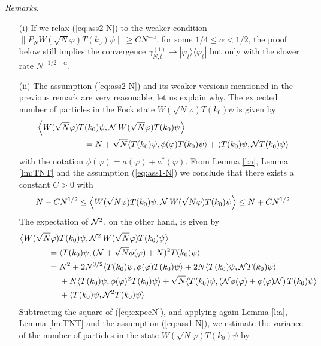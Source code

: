 \documentclass[11pt,a4paper]{article}
\newcommand{\cN}{{\cal N}}
\begin{document}
{\it Remarks. } 
\begin{itemize}
\item[(i)] If we relax (\ref{eq:ass2-N}) to the weaker condition $\| P_N W (\sqrt{N} \varphi) T(k_0) \psi \| \geq C N^{-\alpha}$, for some $1/4 \leq \alpha < 1/2$, the proof below still implies the convergence $\gamma^{(1)}_{N,t} \to |\varphi_t \rangle \langle \varphi_t|$ but only with the slower rate $N^{-1/2+ \alpha}$. 
\item[(ii)] The assumption (\ref{eq:ass2-N}) and its weaker versions mentioned in the previous remark 
are very reasonable; let us explain why. The expected number of particles in the Fock state $W(\sqrt{N} \varphi) T(k_0) \psi$ is given by
\begin{equation}\label{eq:expecN}
\begin{split} &\left\langle W(\sqrt{N} \varphi) T(k_0) \psi , \cN \, W(\sqrt{N} \varphi) T(k_0) \psi \right\rangle \\ & \hspace{2cm}= N + \sqrt{N} \langle T(k_0) \psi , \phi (\varphi) T(k_0) \psi \rangle + \langle T(k_0) \psi , \cN T(k_0) \psi \rangle \end{split} \end{equation}
with the notation $\phi (\varphi) = a(\varphi) + a^* (\varphi)$. {F}rom Lemma \ref{l:a}, Lemma \ref{lm:TNT} and the assumption (\ref{eq:ass1-N}) we conclude that there exists a constant $C >0$ with 
\[ N - CN^{1/2} \leq \left\langle W(\sqrt{N} \varphi) T(k_0) \psi , \cN \, W(\sqrt{N} \varphi) T(k_0) \psi \right\rangle \leq N + C N^{1/2} \]
The expectation of $\cN^2$, on the other hand, is given by
\[ \begin{split} 
\big\langle W(\sqrt{N} \varphi) &T(k_0)  \psi , \cN^2 \, W(\sqrt{N} \varphi) T(k_0) \psi \big\rangle \\
= \; &\langle T(k_0) \psi , (\cN + \sqrt{N} \phi (\varphi) + N)^2 T(k_0) \psi \rangle \\ = \; &N^2 + 2 N^{3/2} \langle T(k_0) \psi , \phi (\varphi) T(k_0) \psi \rangle + 2N \langle T(k_0) \psi , \cN T(k_0) \psi \rangle \\ &+N \langle  T(k_0) \psi , \phi (\varphi)^2 T(k_0) \psi \rangle + \sqrt{N} \langle   T(k_0) \psi ,  \left( \cN \phi (\varphi) + \phi (\varphi) \cN \right) T(k_0) \psi \rangle \\ &+ \langle T(k_0) \psi, \cN^2 T(k_0) \psi \rangle \end{split} \]
 Subtracting the square of (\ref{eq:expecN}), and applying again Lemma \ref{l:a}, Lemma \ref{lm:TNT} and the assumption (\ref{eq:ass1-N}), we estimate the variance of the number of particles in the state $W(\sqrt{N} \varphi) T(k_0) \psi$ by

\end{itemize}
\end{document}
